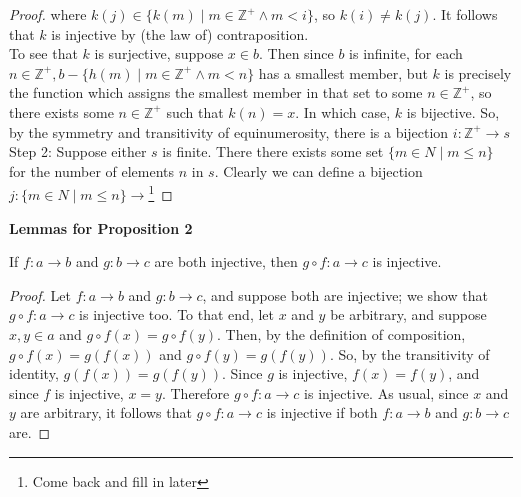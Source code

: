 \documentclass{article}
\begin{document}
\begin{proof}
where $k(j) \in \{k(m) \mid m \in \mathbb{Z^+} \wedge m < i\}$, so $k(i) \neq k(j)$. It follows that $k$ is injective by (the law of) contraposition. \\ To see that $k$ is surjective, suppose $x \in b$. Then since $b$ is infinite, for each $n \in \mathbb{Z^+}, b - \{ h(m) \mid m \in \mathbb{Z^+} \wedge m < n \}$ has a smallest member, but $k$ is precisely the function which assigns the smallest member in that set to some $n \in \mathbb{Z^+}$, so there exists some $n \in \mathbb{Z^+}$ such that $k(n) = x$. In which case, $k$ is bijective. So, by the symmetry and transitivity of equinumerosity, there is a bijection $i: \mathbb{Z^+} \rightarrow s$\\ Step 2: \hspace{0.1cm} Suppose either $s$ is finite. There there exists some set $\{m \in N \mid m \leq n \}$ for the number of elements $n$ in $s$. Clearly we can define a bijection $j: \{m \in N \mid m \leq n \}\rightarrow$\footnote[1]{Come back and fill in later} 
\end{proof}

\begin{center} \textbf{Lemmas for Proposition 2} \end{center}

\begin{lemma} If $f : a \rightarrow b$ and $g : b \rightarrow c$ are both injective, then $g \circ f : a \rightarrow c$ is injective. \end{lemma}
\begin{proof} Let $f : a \rightarrow b$ and $g : b \rightarrow c$, and suppose both are injective; we show that $g \circ f : a \rightarrow c$ is injective too.  To that end, let $x$ and $y$ be arbitrary, and suppose $x,y \in a$ and $g \circ f(x) = g \circ f(y)$. Then, by the definition of composition, $ g \circ f(x) = g(f(x))$ and $g \circ f(y) = g(f(y))$. So, by the transitivity of identity, $g(f(x)) = g(f(y))$. Since $g$ is injective, $f(x) = f(y)$, and since $f$ is injective, $x = y$. Therefore $g \circ f : a \rightarrow c$ is injective. As usual, since $x$ and $y$ are arbitrary, it follows that $g \circ f : a \rightarrow c$ is injective if both $f : a \rightarrow b$ and $g : b \rightarrow c$ are. \end{proof}
\end{document}
